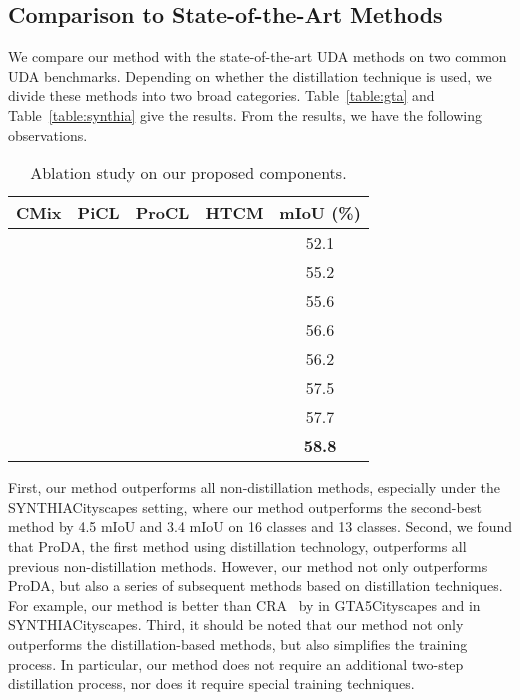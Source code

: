 \documentclass[sigconf]{acmart}
\begin{document}
	\subsection{Comparison to State-of-the-Art Methods}
	We compare our method with the state-of-the-art UDA methods on two common UDA benchmarks.
	Depending on whether the distillation technique is used, we divide these methods into two broad categories. Table~\ref{table:gta} and Table~\ref{table:synthia} give the results. From the results, we have the following observations.
	\begin{table}
		\caption{Ablation study on our proposed components.}
		\centering
		\renewcommand{\arraystretch}{1.2}
		\setlength{\tabcolsep}{6pt}
		\begin{tabular}{c|c|c|c|c}
			\toprule
			CMix	&  PiCL  & ProCL	&	HTCM & mIoU (\%)					\\
			\hline\hline
					&		 	    & 			  & 							& 52.1						        \\
					& 		 	    & 			  & 							& 55.2						        \\
					&		 	    & 			  & 							& 55.6						        \\	
					&		 	    & 			  & 							& 56.6						        \\		
					& 	& 	& 							& 56.2				    \\
					& 	& 			  &  			& 57.5				      \\
					& 			  & 	& 				& 57.7 				      \\
					& 	& 	& 				& \textbf{58.8}	\\
			\bottomrule	
		\end{tabular}
		\vspace{2mm}	
		
		\label{table:ablation_component}
	\end{table}
	


	First, our method outperforms all non-distillation methods, especially under the SYNTHIACityscapes setting, where our method outperforms the second-best method by 4.5 mIoU and 3.4  mIoU on 16 classes and 13 classes.
	Second, we found that ProDA, the first method using distillation technology, outperforms all previous non-distillation methods. However, our method not only outperforms ProDA, but also a series of subsequent methods based on distillation techniques. For example, our method is better than CRA~\cite{wang2021cross} by  in GTA5Cityscapes and  in SYNTHIACityscapes. Third, it should be noted that our method not only outperforms the distillation-based methods, but also simplifies the training process. In particular, our method does not require an additional two-step distillation process, nor does it require special training techniques. 
	
\end{document}
